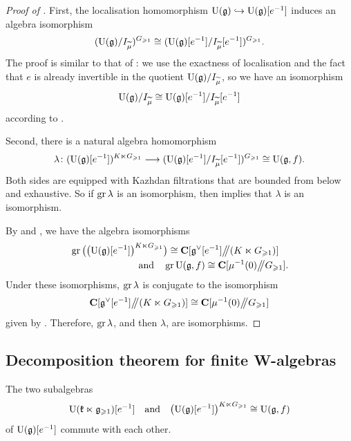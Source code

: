 \begin{proof}[Proof of ]
	First, the localisation homomorphism $\mathrm U(\mathfrak g) \hookrightarrow \mathrm U(\mathfrak g)[e^{-1}]$ induces an algebra isomorphism
	\[ (\mathrm U(\mathfrak g) / I_{\widetilde \mu} )^{G_{\geqslant 1}} \cong (\mathrm U(\mathfrak g)[e^{-1}] / I_{\widetilde \mu} [e^{-1}])^{G_{\geqslant 1}}. \]
	The proof is similar to that of : we use the exactness of localisation and the fact that $e$ is already invertible in the quotient $\mathrm U(\mathfrak g) / I_{\widetilde \mu}$, so we have an isomorphism
	\[ \mathrm U(\mathfrak g) / I_{\widetilde \mu}  \cong \mathrm U(\mathfrak g)[e^{-1}] / I_{\widetilde \mu} [e^{-1}] \]
	according to \cite[Proposition 3.6]{stenstrom1975rings}.
	
	Second, there is a natural algebra homomorphism
	\[ \lambda\colon (\mathrm U(\mathfrak g)[e^{-1}])^{K \ltimes G_{\geqslant 1}} \longrightarrow  (\mathrm U(\mathfrak g)[e^{-1}] / I_{\widetilde \mu} [e^{-1}])^{G_{\geqslant 1}} \cong \mathrm U(\mathfrak g, f). \]
	Both sides are equipped with Kazhdan filtrations that are bounded from below and exhaustive. So if $\operatorname{gr} \lambda$ is an isomorphism, then  implies that $\lambda$ is an isomorphism.
	
	By  and , we have the algebra isomorphisms
	\[ \begin{multlined}
		\gr \big(\big(\U(\g)[e^{-1}]\big)^{K \ltimes G_{\geqslant 1}}\big) \cong \C[\g^\vee[e^{-1}] \git (K \ltimes G_{\geqslant 1})] \\ \text{and} \quad \gr \U(\g, f) \cong \C[\mu^{-1}(0) \git G_{\geqslant 1}].
	\end{multlined} \]
	Under these isomorphisms, $\operatorname{gr} \lambda$ is conjugate to the isomorphism
	\[ \mathbf{C}[\mathfrak g^\vee[e^{-1}] \big/\!\!\big/ (K \ltimes G_{\geqslant 1})] \cong  \mathbf{C}[\mu^{-1}(0) \big/\!\!\big/ G_{\geqslant 1}] \]
	given by . Therefore, $\operatorname{gr} \lambda$, and then $\lambda$, are isomorphisms.	
\end{proof}


\subsection{Decomposition theorem for finite W-algebras}

\begin{lemma}
	The two subalgebras
	\[ \mathrm U(\mathfrak k \ltimes \mathfrak g_{\geqslant 1})[e^{-1}] \quad \text{and} \quad \big(\mathrm U(\mathfrak g)[e^{-1}]\big)^{K \ltimes G_{\geqslant 1}} \cong \mathrm U(\mathfrak g, f)  \]
	of $\mathrm U(\mathfrak g)[e^{-1}]$ commute with each other.
\end{lemma}


